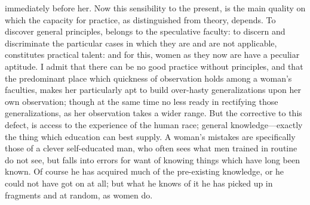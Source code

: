 \documentclass[12pt]{report}
\begin{document}
immediately before her. Now this sensibility to the present, is the main quality on which the capacity for practice, as distinguished from theory, depends. To discover general principles, belongs to the speculative faculty: to discern and discriminate the particular cases in which they are and are not applicable, constitutes practical talent: and for this, women as they now are have a peculiar aptitude. I admit that there can be no good practice without principles, and that the predominant place which quickness of observation holds among a woman's faculties, makes her particularly apt to build over-hasty generalizations upon her own observation; though at the same time no less ready in rectifying those generalizations, as her observation takes a wider range. But the corrective to this defect, is access to the experience of the human race; general knowledge—exactly the thing which education can best supply. A woman's mistakes are specifically those of a clever self-educated man, who often sees what men trained in routine do not see, but falls into errors for want of knowing things which have long been known. Of course he has acquired much of the pre-existing knowledge, or he could not have got on at all; but what he knows of it he has picked up in fragments and at random, as women do.
\end{document}
